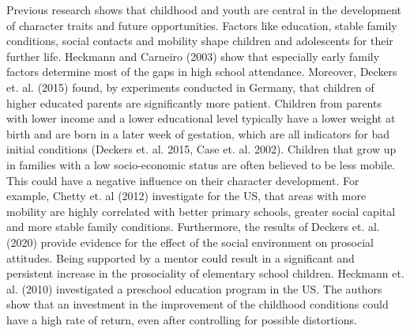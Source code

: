 \documentclass[12pt, a4paper, titlepage]{article}\usepackage[]{graphicx}\usepackage[]{color}
\begin{document}
Previous research shows that childhood and youth are central in the development of character traits and future opportunities. Factors like education, stable family conditions, social contacts and mobility shape children and adolescents for their further life. Heckmann and Carneiro (2003) show that especially early family factors determine most of the gaps in high school attendance. Moreover, Deckers et. al. (2015) found, by experiments conducted in Germany, that children of higher educated parents are significantly more patient. Children from parents with lower income and a lower educational level typically have a lower weight at birth and are born in a later week of gestation, which are all indicators for bad initial conditions (Deckers et. al. 2015, Case et. al. 2002). Children that grow up in families with a low socio-economic status are often believed to be less mobile. This could have a negative influence on their character development. For example, Chetty et. al (2012) investigate for the US, that areas with more mobility are highly correlated with better primary schools, greater social capital and more stable family conditions. Furthermore, the results of Deckers et. al. (2020) provide evidence for the effect of the social environment on prosocial attitudes. Being supported by a mentor could result in a significant and persistent increase in the prosociality of elementary school children. Heckmann et. al. (2010) investigated a preschool education program in the US. The authors show that an investment in the improvement of the childhood conditions could have a high rate of return, even after controlling for possible distortions. 
\end{document}
